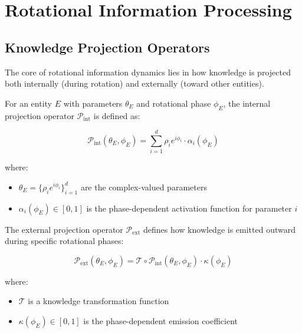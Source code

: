 \section{Rotational Information Processing}

\subsection{Knowledge Projection Operators}

The core of rotational information dynamics lies in how knowledge is projected both internally (during rotation) and externally (toward other entities).

\begin{definition}
For an entity $E$ with parameters $\theta_E$ and rotational phase $\phi_E$, the internal projection operator $\mathcal{P}_{\text{int}}$ is defined as:

\begin{equation}
\mathcal{P}_{\text{int}}(\theta_E, \phi_E) = \sum_{i=1}^d \rho_i e^{i\phi_i} \cdot \alpha_i(\phi_E) 
\end{equation}

where:
\begin{itemize}
    \item $\theta_E = \{\rho_i e^{i\phi_i}\}_{i=1}^d$ are the complex-valued parameters
    \item $\alpha_i(\phi_E) \in [0,1]$ is the phase-dependent activation function for parameter $i$
\end{itemize}
\end{definition}

\begin{definition}
The external projection operator $\mathcal{P}_{\text{ext}}$ defines how knowledge is emitted outward during specific rotational phases:

\begin{equation}
\mathcal{P}_{\text{ext}}(\theta_E, \phi_E) = \mathcal{T} \circ \mathcal{P}_{\text{int}}(\theta_E, \phi_E) \cdot \kappa(\phi_E)
\end{equation}

where:
\begin{itemize}
    \item $\mathcal{T}$ is a knowledge transformation function
    \item $\kappa(\phi_E) \in [0,1]$ is the phase-dependent emission coefficient
\end{itemize}
\end{definition}

